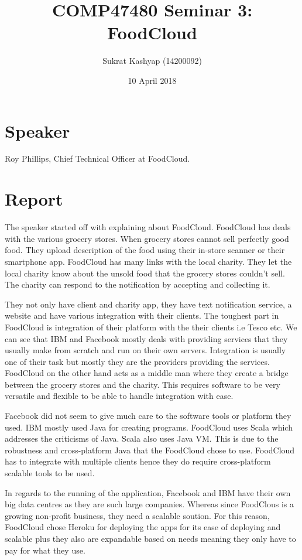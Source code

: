 \documentclass[10pt]{article}
\title{\vspace{-3.0cm}COMP47480 Seminar 3: FoodCloud}
\author{Sukrat Kashyap (14200092)}
\date{10 April 2018}
\begin{document}
\maketitle

\section{Speaker}

Roy Phillips, Chief Technical Officer at FoodCloud.

\section{Report}

The speaker started off with explaining about FoodCloud. FoodCloud has deals with the various grocery stores. When grocery stores cannot sell perfectly good food. They upload description of the food using their in-store scanner or their smartphone app. FoodCloud has many links with the local charity. They let the local charity know about the unsold food that the grocery stores couldn't sell. The charity can respond to the notification by accepting and collecting it.

They not only have client and charity app, they have text notification service, a website and have various integration with their clients. The toughest part in FoodCloud is integration of their platform with the their clients i.e Tesco etc. We can see that IBM and Facebook mostly deals with providing services that they usually make from scratch and run on their own servers. Integration is usually one of their task but mostly they are the providers providing the services. FoodCloud on the other hand acts as a middle man where they create a bridge between the grocery stores and the charity. This requires software to be very versatile and flexible to be able to handle integration with ease.

Facebook did not seem to give much care to the software tools or platform they used. IBM mostly used Java for creating programs. FoodCloud uses Scala which addresses the criticisms of Java. Scala also uses Java VM. This is due to the robustness and cross-platform Java that the FoodCloud chose to use. FoodCloud has to integrate with multiple clients hence they do require cross-platform scalable tools to be used.

In regards to the running of the application, Facebook and IBM have their own big data centres as they are such large companies. Whereas since FoodClous is a growing non-profit business, they need a scalable soution. For this reason, FoodCloud chose Heroku for deploying the apps for its ease of deploying and scalable plus they also are expandable based on needs meaning they only have to pay for what they use.
\end{document}
